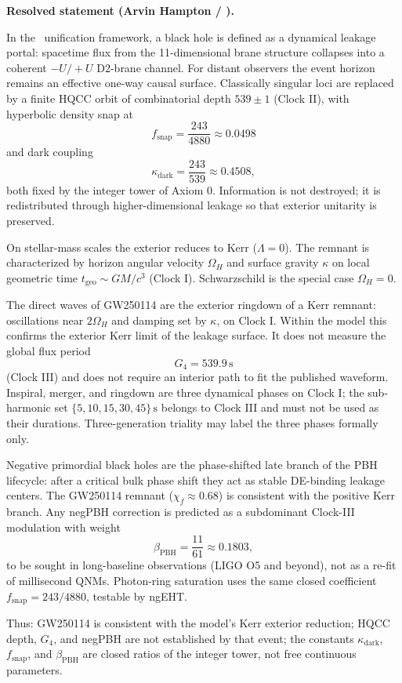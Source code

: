 \noindent\textbf{Resolved statement (Arvin Hampton / \model).}

\medskip
\noindent
In the \model\ unification framework, a black hole is defined as a dynamical
leakage portal: spacetime flux from the 11-dimensional brane structure
collapses into a coherent \(-U/+U\) D2-brane channel. For distant observers the
event horizon remains an effective one-way causal surface. Classically singular
loci are replaced by a finite HQCC orbit of combinatorial depth
\(539\pm 1\) (Clock II), with hyperbolic density snap at
\[
f_{\mathrm{snap}}=\frac{243}{4880}\approx 0.0498
\]
and dark coupling
\[
\kappa_{\mathrm{dark}}=\frac{243}{539}\approx 0.4508,
\]
both fixed by the integer tower of Axiom 0. Information is not destroyed; it is
redistributed through higher-dimensional leakage so that exterior unitarity is
preserved.

On stellar-mass scales the exterior reduces to Kerr (\(\Lambda=0\)). The
remnant is characterized by horizon angular velocity \(\Omega_H\) and surface
gravity \(\kappa\) on local geometric time \(t_{\mathrm{geo}}\sim GM/c^3\)
(Clock I). Schwarzschild is the special case \(\Omega_H=0\).

The direct waves of GW250114 are the exterior ringdown of a Kerr remnant:
oscillations near \(2\Omega_H\) and damping set by \(\kappa\), on Clock I. Within
the model this confirms the exterior Kerr limit of the leakage surface. It does
not measure the global flux period
\[
G_4=539.9\,\mathrm{s}
\]
(Clock III) and does not require an interior path to fit the published
waveform. Inspiral, merger, and ringdown are three dynamical phases on Clock I;
the sub-harmonic set \(\{5,10,15,30,45\}\,\mathrm{s}\) belongs to Clock III and
must not be used as their durations. Three-generation triality may label the
three phases formally only.

Negative primordial black holes are the phase-shifted late branch of the PBH
lifecycle: after a critical bulk phase shift they act as stable DE-binding
leakage centers. The GW250114 remnant (\(\chi_f\approx 0.68\)) is consistent
with the positive Kerr branch. Any negPBH correction is predicted as a
subdominant Clock-III modulation with weight
\[
\beta_{\mathrm{PBH}}=\frac{11}{61}\approx 0.1803,
\]
to be sought in long-baseline observations (LIGO O5 and beyond), not as a
re-fit of millisecond QNMs. Photon-ring saturation uses the same closed
coefficient \(f_{\mathrm{snap}}=243/4880\), testable by ngEHT.

Thus: GW250114 is consistent with the model’s Kerr exterior reduction; HQCC
depth, \(G_4\), and negPBH are not established by that event; the constants
\(\kappa_{\mathrm{dark}}\), \(f_{\mathrm{snap}}\), and \(\beta_{\mathrm{PBH}}\) are
closed ratios of the integer tower, not free continuous parameters.

